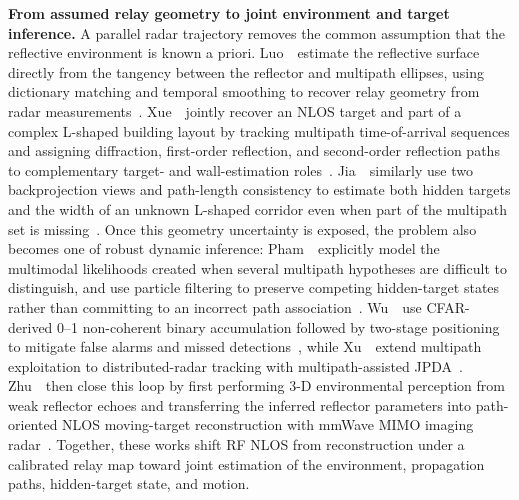 \vspace{0.8mm}
\noindent \textbf{From assumed relay geometry to joint environment and target inference.}
A parallel radar trajectory removes the common assumption that the reflective environment is known a priori. Luo~\etal~estimate the reflective surface directly from the tangency between the reflector and multipath ellipses, using dictionary matching and temporal smoothing to recover relay geometry from radar measurements~\cite{luoReflectiveSurfaceMultipath2025}. Xue~\etal~jointly recover an NLOS target and part of a complex L-shaped building layout by tracking multipath time-of-arrival sequences and assigning diffraction, first-order reflection, and second-order reflection paths to complementary target- and wall-estimation roles~\cite{xueNLOSBuildingLayout2025}. Jia~\etal~similarly use two backprojection views and path-length consistency to estimate both hidden targets and the width of an unknown L-shaped corridor even when part of the multipath set is missing~\cite{jiaUnknownCorridorNLOS2025}. Once this geometry uncertainty is exposed, the problem also becomes one of robust dynamic inference: Pham~\etal~explicitly model the multimodal likelihoods created when several multipath hypotheses are difficult to distinguish, and use particle filtering to preserve competing hidden-target states rather than committing to an incorrect path association~\cite{phamParticleFilterAroundCorner2025}. Wu~\etal~use CFAR-derived 0--1 non-coherent binary accumulation followed by two-stage positioning to mitigate false alarms and missed detections~\cite{wuTwoStageNLOSPositioning2025}, while Xu~\etal~extend multipath exploitation to distributed-radar tracking with multipath-assisted JPDA~\cite{xuDistributedRadarNLOSTracking2025}. Zhu~\etal~then close this loop by first performing 3-D environmental perception from weak reflector echoes and transferring the inferred reflector parameters into path-oriented NLOS moving-target reconstruction with mmWave MIMO imaging radar~\cite{zhuMultipathEnvironmentNLOS2026}. Together, these works shift RF NLOS from reconstruction under a calibrated relay map toward joint estimation of the environment, propagation paths, hidden-target state, and motion.


